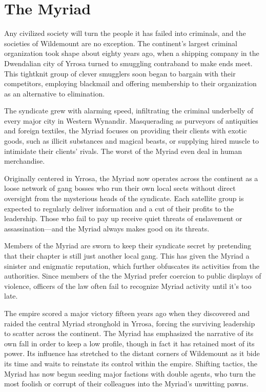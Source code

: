\documentclass[10pt,a4paper,twoside,bg=print,twocolumn,openany,nodeprecatedcode]{dndbook}
\begin{document}
\section{The Myriad}
Any civilized society will turn the people it has failed into criminals, and the societies of Wildemount are no exception. The continent's largest criminal organization took shape about eighty years ago, when a shipping company in the Dwendalian city of Yrrosa turned to smuggling contraband to make ends meet. This tightknit group of clever smugglers soon began to bargain with their competitors, employing blackmail and offering membership to their organization as an alternative to elimination.

The syndicate grew with alarming speed, infiltrating the criminal underbelly of every major city in Western Wynandir. Masquerading as purveyors of antiquities and foreign textiles, the Myriad focuses on providing their clients with exotic goods, such as illicit substances and magical beasts, or supplying hired muscle to intimidate their clients' rivals. The worst of the Myriad even deal in human merchandise.

Originally centered in Yrrosa, the Myriad now operates across the continent as a loose network of gang bosses who run their own local sects without direct oversight from the mysterious heads of the syndicate. Each satellite group is expected to regularly deliver information and a cut of their profits to the leadership. Those who fail to pay up receive quiet threats of enslavement or assassination—and the Myriad always makes good on its threats.

Members of the Myriad are sworn to keep their syndicate secret by pretending that their chapter is still just another local gang. This has given the Myriad a sinister and enigmatic reputation, which further obfuscates its activities from the authorities. Since members of the the Myriad prefer coercion to public displays of violence, officers of the law often fail to recognize Myriad activity until it's too late.

The empire scored a major victory fifteen years ago when they discovered and raided the central Myriad stronghold in Yrrosa, forcing the surviving leadership to scatter across the continent. The Myriad has emphasized the narrative of its own fall in order to keep a low profile, though in fact it has retained most of its power. Its influence has stretched to the distant corners of Wildemount as it bide its time and waits to reinstate its control within the empire. Shifting tactics, the Myriad has now begun seeding major factions with double agents, who turn the most foolish or corrupt of their colleagues into the Myriad's unwitting pawns.
\end{document}

